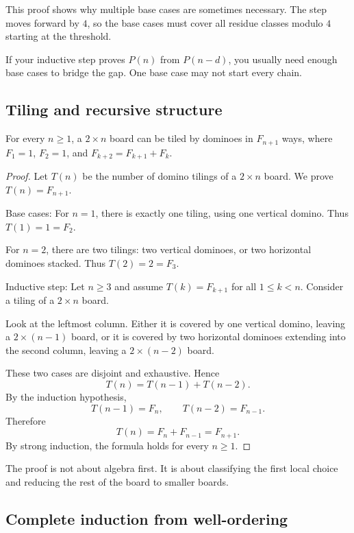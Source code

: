 This proof shows why multiple base cases are sometimes necessary. The step moves forward by $4$, so the base cases must cover all residue classes modulo $4$ starting at the threshold.

\begin{trapbox}
If your inductive step proves $P(n)$ from $P(n-d)$, you usually need enough base cases to bridge the gap. One base case may not start every chain.
\end{trapbox}

\subsection{Tiling and recursive structure}

\begin{theorem}
For every $n\geq1$, a $2\times n$ board can be tiled by dominoes in $F_{n+1}$ ways, where $F_1=1$, $F_2=1$, and $F_{k+2}=F_{k+1}+F_k$.
\end{theorem}

\begin{proof}
Let $T(n)$ be the number of domino tilings of a $2\times n$ board. We prove $T(n)=F_{n+1}$.

Base cases: For $n=1$, there is exactly one tiling, using one vertical domino. Thus $T(1)=1=F_2$.

For $n=2$, there are two tilings: two vertical dominoes, or two horizontal dominoes stacked. Thus $T(2)=2=F_3$.

Inductive step: Let $n\geq3$ and assume $T(k)=F_{k+1}$ for all $1\leq k<n$. Consider a tiling of a $2\times n$ board.

Look at the leftmost column. Either it is covered by one vertical domino, leaving a $2\times(n-1)$ board, or it is covered by two horizontal dominoes extending into the second column, leaving a $2\times(n-2)$ board.

These two cases are disjoint and exhaustive. Hence
\[
T(n)=T(n-1)+T(n-2).
\]
By the induction hypothesis,
\[
T(n-1)=F_n,\qquad T(n-2)=F_{n-1}.
\]
Therefore
\[
T(n)=F_n+F_{n-1}=F_{n+1}.
\]
By strong induction, the formula holds for every $n\geq1$.
\end{proof}

The proof is not about algebra first. It is about classifying the first local choice and reducing the rest of the board to smaller boards.

\subsection{Complete induction from well-ordering}

